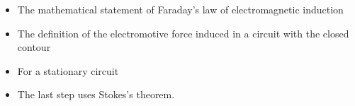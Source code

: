 \begin{ELjoin}

\begin{itemize}
\tightlist
\item
  The mathematical statement of Faraday's law of electromagnetic induction
\end{itemize}

\begin{ELimportant}{}


\end{ELimportant}

\end{ELjoin}

\begin{ELunit}

\begin{itemize}
\tightlist
\item
  The definition of the electromotive force induced in a circuit with the closed contour 
\end{itemize}


\begin{itemize}
\tightlist
\item
  For a stationary circuit
\end{itemize}


\end{ELunit}

\begin{ELjoin}

\begin{itemize}
\tightlist
\item
  The last step uses Stokes's theorem.
\end{itemize}

\begin{ELimportant}{}


\end{ELimportant}

\end{ELjoin}

